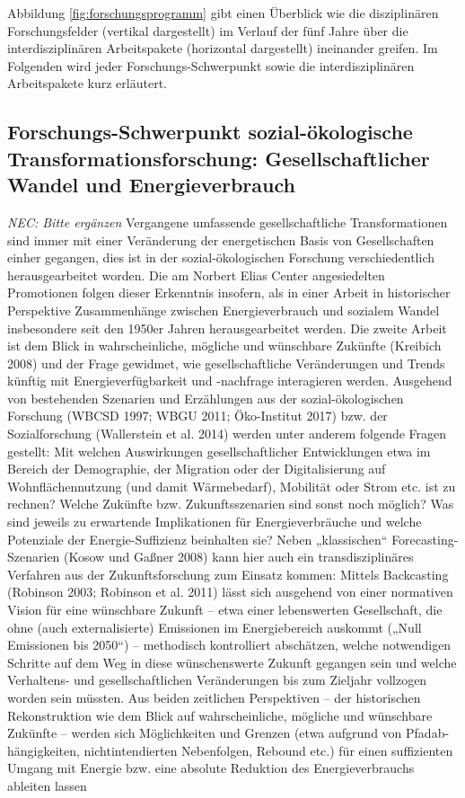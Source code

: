 \documentclass[a4paper,11pt,twoside]{scrartcl}
\begin{document}
Abbildung \ref{fig:forschungsprogramm} gibt einen Überblick wie die disziplinären Forschungsfelder (vertikal dargestellt) im Verlauf der fünf Jahre über die interdisziplinären Arbeitspakete (horizontal dargestellt) ineinander greifen. Im Folgenden wird jeder Forschungs-Schwerpunkt sowie die interdisziplinären Arbeitspakete kurz erläutert.

\subsection*{Forschungs-Schwerpunkt sozial-ökologische Transformationsforschung: Gesellschaftlicher Wandel und Energieverbrauch}
\textit{NEC: Bitte ergänzen}
Vergangene umfassende gesellschaftliche Transformationen sind immer mit einer Veränderung der energetischen Basis von Gesellschaften einher gegangen, dies ist in der sozial-ökologischen Forschung verschiedentlich herausgearbeitet worden. Die am Norbert Elias Center angesiedelten Promotionen folgen dieser Erkenntnis insofern, als in einer Arbeit in historischer Perspektive Zusammenhänge zwischen Energieverbrauch und sozialem Wandel insbesondere seit den 1950er Jahren herausgearbeitet werden. Die zweite Arbeit ist dem Blick in wahrscheinliche, mögliche und wünschbare Zukünfte (Kreibich 2008) und der Frage gewidmet, wie gesellschaftliche Veränderungen und Trends künftig mit Energieverfügbarkeit und -nachfrage interagieren werden. Ausgehend von bestehenden Szenarien und Erzählungen aus der sozial-ökologischen Forschung (WBCSD 1997; WBGU 2011; Öko-Institut 2017) bzw. der Sozialforschung (Wallerstein et al. 2014) werden unter anderem folgende Fragen gestellt: Mit welchen Auswirkungen gesellschaftlicher Entwicklungen etwa im Bereich der Demographie, der Migration oder der Digitalisierung auf Wohnflächennutzung (und damit Wärmebedarf), Mobilität oder Strom etc. ist zu rechnen? Welche Zukünfte bzw. Zukunftsszenarien sind sonst noch möglich? Was sind jeweils zu erwartende Implikationen für Energieverbräuche und welche Potenziale der Energie-Suffizienz beinhalten sie? Neben „klassischen“ Forecasting-Szenarien (Kosow und Gaßner 2008) kann hier auch ein transdisziplinäres Verfahren aus der Zukunftsforschung zum Einsatz kommen: Mittels Backcasting (Robinson 2003; Robinson et al. 2011) lässt sich ausgehend von einer normativen Vision für eine wünschbare Zukunft – etwa einer lebenswerten Gesellschaft, die ohne (auch externalisierte) Emissionen im Energiebereich auskommt („Null Emissionen bis 2050“) – methodisch kontrolliert abschätzen, welche notwendigen Schritte auf dem Weg in diese wünschenswerte Zukunft gegangen sein und welche Verhaltens- und gesellschaftlichen Veränderungen bis zum Zieljahr vollzogen worden sein müssten. 
Aus beiden zeitlichen Perspektiven – der historischen Rekonstruktion wie dem Blick auf wahrscheinliche, mögliche und wünschbare Zukünfte – werden sich Möglichkeiten und Grenzen (etwa aufgrund von Pfadab-hängigkeiten, nichtintendierten Nebenfolgen, Rebound etc.) für einen suffizienten Umgang mit Energie bzw. eine absolute Reduktion des Energieverbrauchs ableiten lassen  
\end{document}
